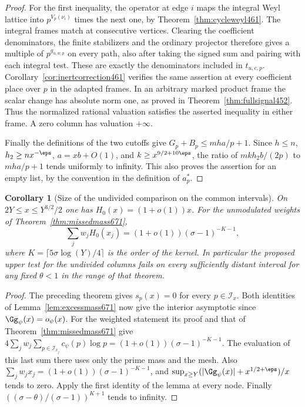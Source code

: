 \documentclass[a4paper,11pt]{article}
\newtheorem{corollary}[proposition]{Corollary}
\theoremstyle{definition}
\theoremstyle{remark}
\numberwithin{equation}{section}
\begin{document}
\begin{proof}
For the first inequality, the operator at edge \(i\) maps the
integral Weyl lattice into \(p^{V_p(\nu_i)}\) times the next
one, by Theorem~\ref{thm:cycleweyl461}. The integral frames
match at consecutive vertices. Clearing the coefficient
denominators, the finite stabilizers and the ordinary projector
therefore gives a multiple of \(p^{g_{u,w,p}}\) on every path,
also after taking the signed sum and pairing with each integral
test. These are exactly the denominators included in \(t_{u,c,p}\).
Corollary~\ref{cor:inertcorrection461} verifies the same assertion
at every coefficient place over \(p\) in the adapted frames.
In an arbitrary marked product frame the scalar change has
absolute norm one, as proved in Theorem~\ref{thm:fullsignal452}.
Thus the normalized rational valuation satisfies the asserted
inequality in either frame. A zero column has valuation
\(+\infty\).

Finally the definitions of the two cutoffs give
\(G_p+B_p\le mha/p+1\). Since \(h\le n\),
\(h_2\ge nx^{-\eps}\), \(a=xb+O(1)\), and
\(k\ge x^{9/2+10\eps}\), the ratio of \(mkh_2 b/(2p)\) to
\(mha/p+1\) tends uniformly to infinity. This also proves the
assertion for an empty list, by the convention in the definition
of \(a_p^*\).
\end{proof}

\begin{corollary}[Size of the undivided comparison on the common intervals]
\leavevmode\label{cor:rawfailure672}
On \(2Y\le x\le Y^{3/2}/2\) one has \(H_0(x)=(1+o(1))x\).
For the unmodulated weights of Theorem~\ref{thm:missedmass671},
\[
             \sum_j w_j H_0(x_j)=(1+o(1))(\sigma-1)^{-K-1},
\]
where \(K=\lceil5\sigma\log(Y)/4\rceil\) is the order of the
kernel. In particular the proposed upper test for the
undivided columns fails on every sufficiently distant interval
for any fixed \(\theta<1\) in the range of that theorem.
\end{corollary}
\begin{proof}
The preceding theorem gives \(s_p(x)=0\) for every \(p\in\mathcal
I_x\). Both identities of Lemma~\ref{lem:excessmass671} now give
the interior asymptotic since \(\Gg_\psi(x)=o_\psi(x)\).
For the weighted statement its proof and that of
Theorem~\ref{thm:missedmass671} give
\(4\sum_jw_j\sum_{p\in\mathcal I_{x_j}}c_\psi(p)\log p
=(1+o(1))(\sigma-1)^{-K-1}\). The evaluation of this last
sum there uses only the prime mass and the mesh. Also
\(\sum_j w_j x_j=(1+o(1))(\sigma-1)^{-K-1}\), and
\(\sup_{x\ge Y}(|\Gg_\psi(x)|+x^{1/2+\eps})/x\) tends to zero.
Apply the first identity of the lemma at every node.
Finally \(((\sigma-\theta)/(\sigma-1))^{K+1}\) tends to infinity.
\end{proof}
\end{document}

